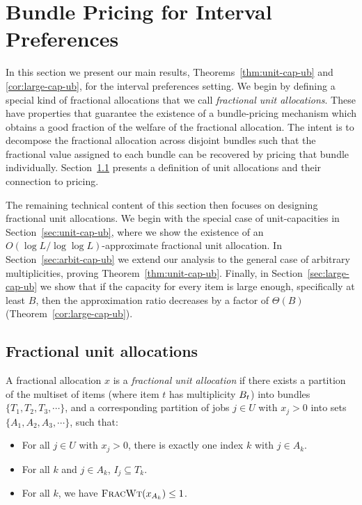 \section{Bundle Pricing for Interval Preferences}
\label{sec:ub-interval}

In this section we present our main results,
Theorems~\ref{thm:unit-cap-ub} and \ref{cor:large-cap-ub}, for the
interval preferences setting. We begin by defining a special kind of
fractional allocations that we call {\em fractional unit
  allocations}. These have properties that guarantee the existence of
a bundle-pricing mechanism which obtains a good fraction of the
welfare of the fractional allocation. The intent is to decompose the
fractional allocation across disjoint bundles such that the fractional
value assigned to each bundle can be recovered by pricing that bundle
individually. Section~\ref{sec:frac-unit-alloc} presents a definition of
unit allocations and their connection to pricing.


The remaining technical content of this section then focuses on
designing fractional unit allocations. We begin with the special case
of unit-capacities in Section~\ref{sec:unit-cap-ub}, where we show the
existence of an $O(\log L/\log\log L)$-approximate fractional unit
allocation. In Section~\ref{sec:arbit-cap-ub} we extend our analysis
to the general case of arbitrary multiplicities, proving
Theorem~\ref{thm:unit-cap-ub}. Finally, in
Section~\ref{sec:large-cap-ub} we show that if the capacity for every
item is large enough, specifically at least $B$, then the
approximation ratio decreases by a factor of $\Theta(B)$
(Theorem~\ref{cor:large-cap-ub}).

\subsection{Fractional unit allocations}
\label{sec:frac-unit-alloc}

\begin{definition} A fractional allocation $x$ is a {\em fractional
    unit allocation} if there exists a partition of the multiset of
  items (where item $t$ has multiplicity $B_t$) into bundles
  $\{T_1, T_2, T_3, \cdots\}$, and a corresponding partition of jobs
  $j\in U$ with $x_j>0$ into sets $\{A_1, A_2, A_3, \cdots\}$, such
  that:
    \begin{itemize}
        \item For all $j\in U$ with $x_j>0$, there is exactly one
          index $k$ with $j\in A_k$. 
        \item For all $k$ and $j\in A_k$, $I_j\subseteq T_k$.
        \item For all $k$, we have ${\normalfont\textsc{FracWt}}(x_{A_k}) \le 1$.
   \end{itemize}
\end{definition}

